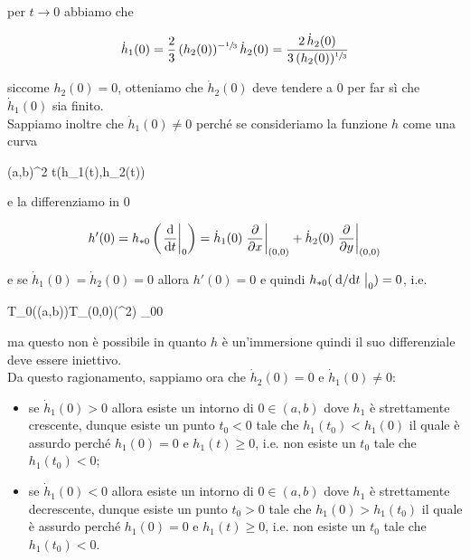 per $ t \to 0 $ abbiamo che

\begin{equation}
		\dot{h}_{1}(0) = \dfrac{2}{3} \, (h_{2}(0))^{-\sfrac{1}{3}} \, \dot{h}_{2}(0) %
		= \dfrac{2 \, \dot{h}_{2}(0)}{3 \, (h_{2}(0))^{\sfrac{1}{3}}}
\end{equation}

siccome $ h_{2}(0)=0 $, otteniamo che $ \dot{h}_{2}(0) $ deve tendere a 0 per far sì che $ \dot{h}_{1}(0) $ sia finito. \\
Sappiamo inoltre che $ \dot{h}_{1}(0) \neq 0 $ perché se consideriamo la funzione $ h $ come una curva

	{(a,b)}{\R^{2}}
	{t}{(h_{1}(t),h_{2}(t))}

e la differenziamo in $ 0 $

\begin{equation}
	h'(0) = h_{*0} \left( \eval{ \dv{t} }_{0} \right) %
	= \dot{h}_{1}(0) \eval{ \pdv{x} }_{(0,0)} + \dot{h}_{2}(0) \eval{ \pdv{y} }_{(0,0)}
\end{equation}

e se $ \dot{h}_{1}(0) = \dot{h}_{2}(0) = 0 $ allora $ h'(0) = 0 $ e quindi $ h_{*0} ( \eval{ \dv*{t} }_{0} ) = 0 $, i.e.

	{T_{0}((a,b))}{T_{(0,0)}(\R^{2})}
	{_{0}}{0}

ma questo non è possibile in quanto $ h $ è un'immersione quindi il suo differenziale deve essere iniettivo. \\
Da questo ragionamento, sappiamo ora che $ \dot{h}_{2}(0)=0 $ e $ \dot{h}_{1}(0) \neq 0 $:

\begin{itemize}
	\item se $ \dot{h}_{1}(0) > 0 $ allora esiste un intorno di $ 0 \in (a,b) $ dove $ h_{1} $ è strettamente crescente, dunque esiste un punto $ t_{0}<0 $ tale che $ h_{1}(t_{0}) < h_{1}(0) $ il quale è assurdo perché $ h_{1}(0) = 0 $ e $ h_{1}(t) \geqslant 0 $, i.e. non esiste un $ t_{0} $ tale che $ h_{1}(t_{0}) < 0 $;
	
	\item se $ \dot{h}_{1}(0) < 0 $ allora esiste un intorno di $ 0 \in (a,b) $ dove $ h_{1} $ è strettamente decrescente, dunque esiste un punto $ t_{0}>0 $ tale che $ h_{1}(0) > h_{1}(t_{0}) $ il quale è assurdo perché $ h_{1}(0) = 0 $ e $ h_{1}(t) \geqslant 0 $, i.e. non esiste un $ t_{0} $ tale che $ h_{1}(t_{0}) < 0 $.
\end{itemize}

